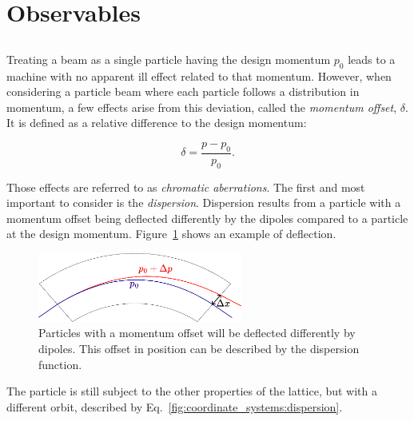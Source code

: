 \section{Observables}

\subsection{}

Treating a beam as a single particle having the design momentum $p_0$ leads to a machine with no
apparent ill effect related to that momentum.
However, when considering a particle beam where each particle follows a distribution in
momentum, a few effects arise from this deviation, called the \textit{momentum offset},
$\delta$. It is defined as a relative difference to the design momentum:

\begin{equation}
    \delta = \frac{p - p_0}{p_0}.
    \label{eq:coordinate_systems:momentum_offset}
\end{equation}

Those effects are referred to as \textit{chromatic aberrations}. The first and most important to
consider is the \textit{dispersion}. Dispersion results from a particle with a momentum offset
being deflected differently by the dipoles compared to a particle at the design momentum.
Figure~\ref{fig:coordinate_systems:dispersion} shows an example of deflection. 

\begin{figure}[H]
    \centering
    \includegraphics[width=0.6\textwidth]{images/dipole.pdf}
    \caption{Particles with a momentum offset will be deflected differently by dipoles. This offset
            in position can be described by the dispersion function.}
    \label{fig:coordinate_systems:dispersion}
\end{figure}

The particle is still subject to the other properties of the lattice, but with a different orbit,
described by Eq.~\eqref{fig:coordinate_systems:dispersion}.

